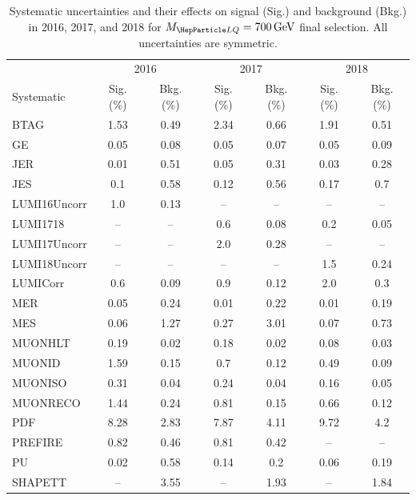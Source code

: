 \begin{table}[H]
	\begin{center}
        \begin{footnotesize}
			\caption{Systematic uncertainties and their effects on signal (Sig.) and background (Bkg.) in 2016, 2017, and 2018 for $\MLQ = \SI{700}{GeV}$ final selection. All uncertainties are symmetric.}
			\begin{tabular}{lcccccc} \hline \hline
				& \multicolumn{2}{c}{2016} & \multicolumn{2}{c}{2017} & \multicolumn{2}{c}{2018} \\
				Systematic & Sig. (\%) & Bkg. (\%) & Sig. (\%) & Bkg. (\%) & Sig. (\%) & Bkg. (\%) \\ \hline
				BTAG &  1.53  &  0.49 &  2.34  &  0.66 &  1.91  &  0.51 \\
				GE &  0.05  &  0.08 &  0.05  &  0.07 &  0.05  &  0.09 \\
				JER &  0.01  &  0.51 &  0.05  &  0.31 &  0.03  &  0.28 \\
				JES &  0.1  &  0.58 &  0.12  &  0.56 &  0.17  &  0.7 \\
				LUMI16Uncorr &  1.0  &  0.13 & -- & -- & -- & -- \\
				LUMI1718 & -- & -- &  0.6  &  0.08 &  0.2  &  0.05 \\
				LUMI17Uncorr & -- & -- &  2.0  &  0.28 & -- & -- \\
				LUMI18Uncorr & -- & -- & -- & -- &  1.5  &  0.24 \\
				LUMICorr &  0.6  &  0.09 &  0.9  &  0.12 &  2.0  &  0.3 \\
				MER &  0.05  &  0.24 &  0.01  &  0.22 &  0.01  &  0.19 \\
				MES &  0.06  &  1.27 &  0.27  &  3.01 &  0.07  &  0.73 \\
				MUONHLT &  0.19  &  0.02 &  0.18  &  0.02 &  0.08  &  0.03 \\
				MUONID &  1.59  &  0.15 &  0.7  &  0.12 &  0.49  &  0.09 \\
				MUONISO &  0.31  &  0.04 &  0.24  &  0.04 &  0.16  &  0.05 \\
				MUONRECO &  1.44  &  0.24 &  0.81  &  0.15 &  0.66  &  0.12 \\
				PDF &  8.28  &  2.83 &  7.87  &  4.11 &  9.72  &  4.2 \\
				PREFIRE &  0.82  &  0.46 &  0.81  &  0.42 & -- & -- \\
				PU &  0.02  &  0.58 &  0.14  &  0.2 &  0.06  &  0.19 \\
				SHAPETT & -- &  3.55 & -- &  1.93 & -- &  1.84 \\

\end{tabular}
\end{footnotesize}
\end{center}
\end{table}
